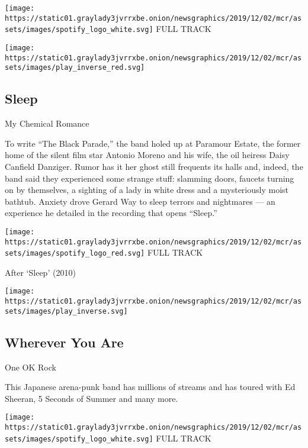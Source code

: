 \href{https://open.spotify.com/track/5GtaLmLIpQNshjXxlms6Ke?si=o_aD9IwgTMinH-1vHrja_Q}{}

\texttt{[image: https://static01.graylady3jvrrxbe.onion/newsgraphics/2019/12/02/mcr/assets/images/spotify\_logo\_white.svg]}
FULL TRACK

\texttt{[image: https://static01.graylady3jvrrxbe.onion/newsgraphics/2019/12/02/mcr/assets/images/play\_inverse\_red.svg]}

\hypertarget{sleep-1}{%
\subsection{Sleep}\label{sleep-1}}

My Chemical Romance

To write ``The Black Parade,'' the band holed up at Paramour Estate, the
former home of the silent film star Antonio Moreno and his wife, the oil
heiress Daisy Canfield Danziger. Rumor has it her ghost still frequents
its halls and, indeed, the band said they experienced some strange
stuff: slamming doors, faucets turning on by themselves, a sighting of a
lady in white dress and a mysteriously moist bathtub. Anxiety drove
Gerard Way to sleep terrors and nightmares --- an experience he detailed
in the recording that opens ``Sleep.''

\href{https://open.spotify.com/track/2pONuBYwWrNm9jcJH6hmPc?si=Trh1eyUgTK-2Y715PS2WJw}{}

\texttt{[image: https://static01.graylady3jvrrxbe.onion/newsgraphics/2019/12/02/mcr/assets/images/spotify\_logo\_red.svg]}
FULL TRACK

After `Sleep' (2010)

\texttt{[image: https://static01.graylady3jvrrxbe.onion/newsgraphics/2019/12/02/mcr/assets/images/play\_inverse.svg]}

\hypertarget{wherever-you-are}{%
\subsection{Wherever You Are}\label{wherever-you-are}}

One OK Rock

This Japanese arena-punk band has millions of streams and has toured
with Ed Sheeran, 5 Seconds of Summer and many more.

\href{https://open.spotify.com/track/0YAMQSmHk6BSUGTYpaoqTJ?si=JTZMtIiqTiWoIzFdAMq3QA}{}

\texttt{[image: https://static01.graylady3jvrrxbe.onion/newsgraphics/2019/12/02/mcr/assets/images/spotify\_logo\_white.svg]}
FULL TRACK

